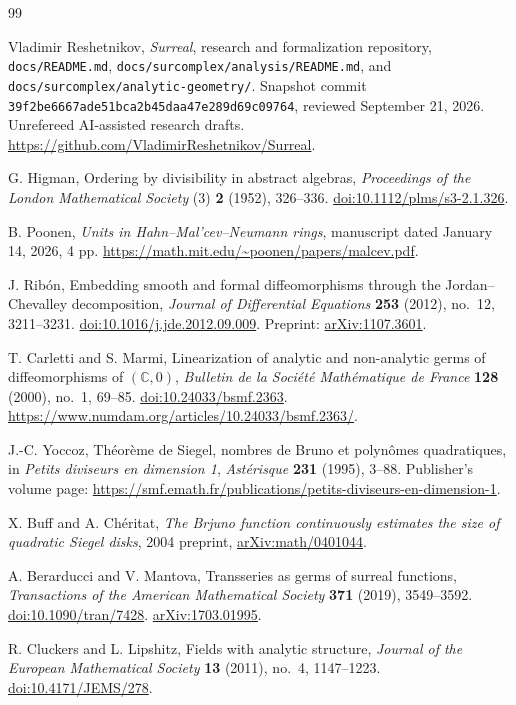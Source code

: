 \documentclass[11pt,letterpaper]{article}
\theoremstyle{definition}
\theoremstyle{remark}
\newcommand{\C}{\mathbb C}
\numberwithin{equation}{section}
\begin{document}
\begin{thebibliography}{99}
\raggedright

Vladimir Reshetnikov,
\emph{Surreal}, research and formalization repository,
\texttt{docs/README.md},
\texttt{docs/surcomplex/analysis/README.md}, and
\texttt{docs/surcomplex/analytic-geometry/}.
Snapshot commit
\texttt{39f2be6667ade51bca2b45daa47e289d69c09764},
reviewed September 21, 2026. Unrefereed AI-assisted research drafts.
\url{https://github.com/VladimirReshetnikov/Surreal}.

G. Higman,
Ordering by divisibility in abstract algebras,
\emph{Proceedings of the London Mathematical Society} (3) \textbf{2}
(1952), 326--336.
\href{https://doi.org/10.1112/plms/s3-2.1.326}{doi:10.1112/plms/s3-2.1.326}.

B. Poonen,
\emph{Units in Hahn--Mal'cev--Neumann rings},
manuscript dated January 14, 2026, 4 pp.
\url{https://math.mit.edu/~poonen/papers/malcev.pdf}.

J. Rib\'on,
Embedding smooth and formal diffeomorphisms through the Jordan--Chevalley
decomposition,
\emph{Journal of Differential Equations} \textbf{253} (2012), no.~12,
3211--3231.
\href{https://doi.org/10.1016/j.jde.2012.09.009}{doi:10.1016/j.jde.2012.09.009}.
Preprint: \href{https://arxiv.org/abs/1107.3601}{arXiv:1107.3601}.

T. Carletti and S. Marmi,
Linearization of analytic and non-analytic germs of diffeomorphisms of
$(\C,0)$,
\emph{Bulletin de la Soci\'et\'e Math\'ematique de France}
\textbf{128} (2000), no.~1, 69--85.
\href{https://doi.org/10.24033/bsmf.2363}{doi:10.24033/bsmf.2363}.
\url{https://www.numdam.org/articles/10.24033/bsmf.2363/}.

J.-C. Yoccoz,
Th\'eor\`eme de Siegel, nombres de Bruno et polyn\^omes quadratiques,
in \emph{Petits diviseurs en dimension 1},
\emph{Ast\'erisque} \textbf{231} (1995), 3--88.
Publisher's volume page:
\url{https://smf.emath.fr/publications/petits-diviseurs-en-dimension-1}.

X. Buff and A. Ch\'eritat,
\emph{The Brjuno function continuously estimates the size of quadratic
Siegel disks}, 2004 preprint,
\href{https://arxiv.org/abs/math/0401044}{arXiv:math/0401044}.

A. Berarducci and V. Mantova,
Transseries as germs of surreal functions,
\emph{Transactions of the American Mathematical Society}
\textbf{371} (2019), 3549--3592.
\href{https://doi.org/10.1090/tran/7428}{doi:10.1090/tran/7428}.
\href{https://arxiv.org/abs/1703.01995}{arXiv:1703.01995}.

R. Cluckers and L. Lipshitz,
Fields with analytic structure,
\emph{Journal of the European Mathematical Society}
\textbf{13} (2011), no.~4, 1147--1223.
\href{https://doi.org/10.4171/JEMS/278}{doi:10.4171/JEMS/278}.

\end{thebibliography}
\end{document}

